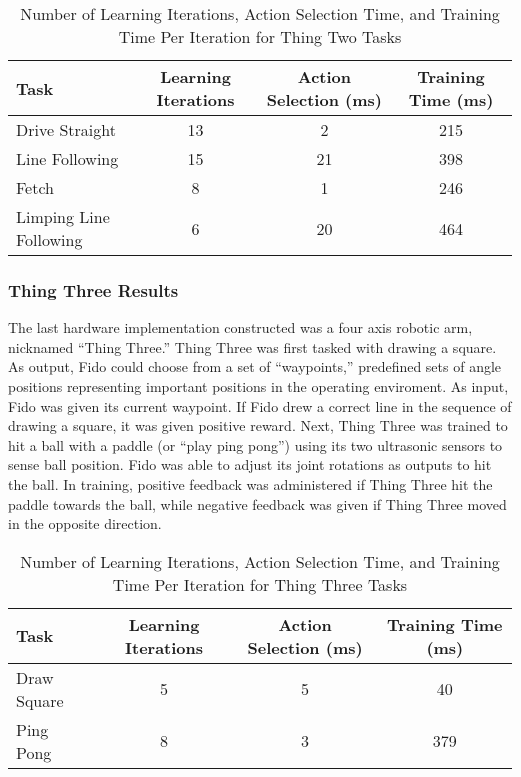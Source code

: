 \begin{table}[ht]
	\centering
	\begin{tabular}{@{}lccc@{}}
		\toprule
		Task              & Learning Iterations & Action Selection (ms) & Training Time (ms) \\ \midrule
		Drive Straight         & 13             & 2                     & 215                \\
		Line Following         & 15             & 21                    & 398                \\
		Fetch                  & 8              & 1                     & 246                \\
		Limping Line Following & 6              & 20                    & 464                \\ \bottomrule
	\end{tabular}
	\caption {Number of Learning Iterations, Action Selection Time, and Training Time Per Iteration for Thing Two Tasks} \label{tab:thingtworesults}
\end{table}

\subsubsection{Thing Three Results}

The last hardware implementation constructed was a four axis robotic arm, nicknamed ``Thing Three.''
Thing Three was first tasked with drawing a square.
As output, Fido could choose from a set of ``waypoints,'' predefined sets of angle positions representing important positions in the operating enviroment.
As input, Fido was given its current waypoint.
If Fido drew a correct line in the sequence of drawing a square, it was given positive reward.
Next, Thing Three was trained to hit a ball with a paddle (or ``play ping pong'') using its two ultrasonic sensors to sense ball position.
Fido was able to adjust its joint rotations as outputs to hit the ball.
In training, positive feedback was administered if Thing Three hit the paddle towards the ball, while negative feedback was given if Thing Three moved in the opposite direction.

\begin{table}[ht]
	\centering
	\begin{tabular}{@{}lccc@{}}
		\toprule
		Task              & Learning Iterations & Action Selection (ms) & Training Time (ms) \\ \midrule
		Draw Square         & 5                   & 5                    & 40                 \\
		Ping Pong          & 8                  & 3                    & 379                \\
		\bottomrule
	\end{tabular}
	\caption {Number of Learning Iterations, Action Selection Time, and Training Time Per Iteration for Thing Three Tasks} \label{tab:thingthreeresults}
\end{table}
